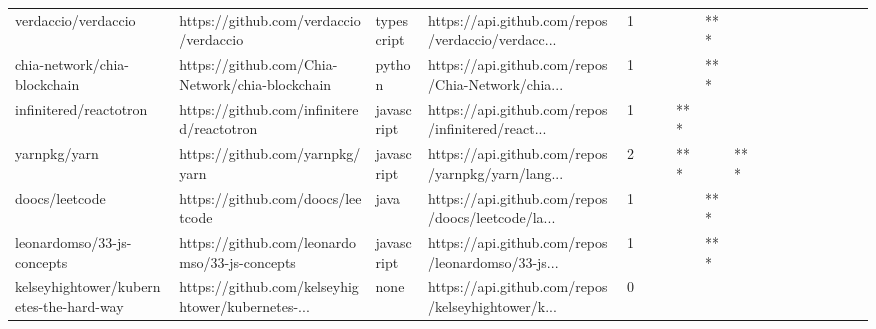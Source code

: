 \begin{tabular}{llllrlllllllllllll}
verdaccio/verdaccio                                &             https://github.com/verdaccio/verdaccio &        typescript &  https://api.github.com/repos/verdaccio/verdacc... &       1 &         &        &           &            *** &                 &        &           &           &          &          &       &              &          \\
chia-network/chia-blockchain                       &    https://github.com/Chia-Network/chia-blockchain &            python &  https://api.github.com/repos/Chia-Network/chia... &       1 &         &        &           &            *** &                 &        &           &           &          &          &       &              &          \\
infinitered/reactotron                             &          https://github.com/infinitered/reactotron &        javascript &  https://api.github.com/repos/infinitered/react... &       1 &         &        &       *** &                &                 &        &           &           &          &          &       &              &          \\
yarnpkg/yarn                                       &                    https://github.com/yarnpkg/yarn &        javascript &  https://api.github.com/repos/yarnpkg/yarn/lang... &       2 &         &        &       *** &                &             *** &        &           &           &          &          &       &              &          \\
doocs/leetcode                                     &                  https://github.com/doocs/leetcode &              java &  https://api.github.com/repos/doocs/leetcode/la... &       1 &         &        &           &            *** &                 &        &           &           &          &          &       &              &          \\
leonardomso/33-js-concepts                         &      https://github.com/leonardomso/33-js-concepts &        javascript &  https://api.github.com/repos/leonardomso/33-js... &       1 &         &        &           &            *** &                 &        &           &           &          &          &       &              &          \\
kelseyhightower/kubernetes-the-hard-way            &  https://github.com/kelseyhightower/kubernetes-... &              none &  https://api.github.com/repos/kelseyhightower/k... &       0 &         &        &           &                &                 &        &           &           &          &          &       &              &          \\

\end{tabular}
